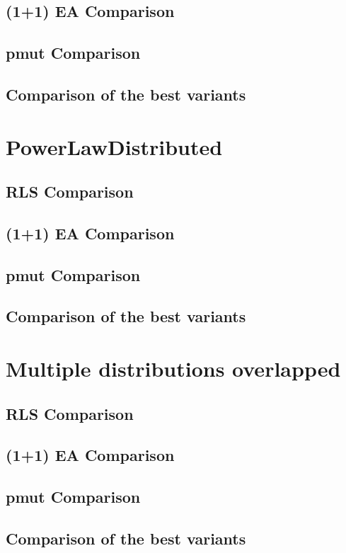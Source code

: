 \subsection{(1+1) EA Comparison}
\subsection{pmut Comparison}
\subsection{Comparison of the best variants}

\section{PowerLawDistributed}
\subsection{RLS Comparison}
\subsection{(1+1) EA Comparison}
\subsection{pmut Comparison}
\subsection{Comparison of the best variants}

\section{Multiple distributions overlapped}
\subsection{RLS Comparison}
\subsection{(1+1) EA Comparison}
\subsection{pmut Comparison}
\subsection{Comparison of the best variants}

